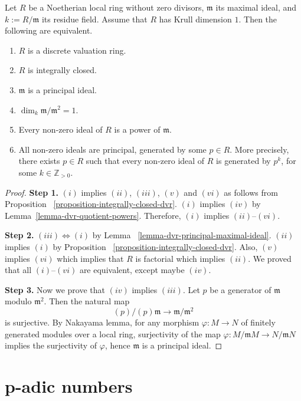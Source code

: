 \begin{theorem}
\label{theorem-dvr-characterizations}
Let $R$ be a Noetherian local ring without
zero divisors, $\mathfrak{m}$ its maximal
ideal, and $k:=R/\mathfrak{m}$ its residue
field. Assume that $R$ has Krull dimension
$1$. Then the following are equivalent.
\begin{enumerate}
\item[$(i)$] $R$ is a discrete valuation ring.
\item[$(ii)$] $R$ is integrally closed.
\item[$(iii)$] $\mathfrak{m}$ is a principal ideal.
\item[$(iv)$] $\dim_k \mathfrak{m}/\mathfrak{m}^2 = 1$.
\item[$(v)$] Every non-zero ideal of $R$ 
is a power of $\mathfrak{m}$.
\item[$(vi)$]
All non-zero ideals are principal, 
generated by
some $p \in R$. More precisely,
there exists $p\in R$ such that every 
non-zero ideal of $R$ is generated by $p^k$, 
for some $k\in \mathbb{Z}_{>0}$.
\end{enumerate}
\end{theorem}

\begin{proof}
\textbf{Step 1.} $(i)$ implies $(ii)$,
$(iii)$, $(v)$ and $(vi)$ as follows from
Proposition~
\ref{proposition-integrally-closed-dvr}.
$(i)$ implies $(iv)$ by
Lemma~\ref{lemma-dvr-quotient-powers}.
Therefore, $(i)$ implies $(ii)$--$(vi)$.

\textbf{Step 2.} $(iii)\Leftrightarrow (i)$
by Lemma~
\ref{lemma-dvr-principal-maximal-ideal}.
$(ii)$ implies $(i)$ by
Proposition~
\ref{proposition-integrally-closed-dvr}.
Also, $(v)$ implies $(vi)$ which implies that
$R$ is factorial which implies $(ii)$.
We proved that all $(i)$--$(vi)$ are
equivalent, except maybe $(iv)$.

\textbf{Step 3.} Now we prove that $(iv)$
implies $(iii)$. Let $p$ be a generator of
$\mathfrak{m}$ modulo $\mathfrak{m}^2$.
Then the natural map
$$
(p)/(p)\mathfrak{m}
\to \mathfrak{m}/\mathfrak{m}^2
$$
is surjective. By Nakayama lemma, for any
morphism $\varphi:M\to N$ of finitely
generated modules over a local ring,
surjectivity of the map
$\varphi:M/\mathfrak{m}M\to N/\mathfrak{m}N$
implies the surjectivity of $\varphi$,
hence $\mathfrak{m}$ is a principal ideal.
\end{proof}

\section{p-adic numbers}
\label{section-p-adic-numbers}

